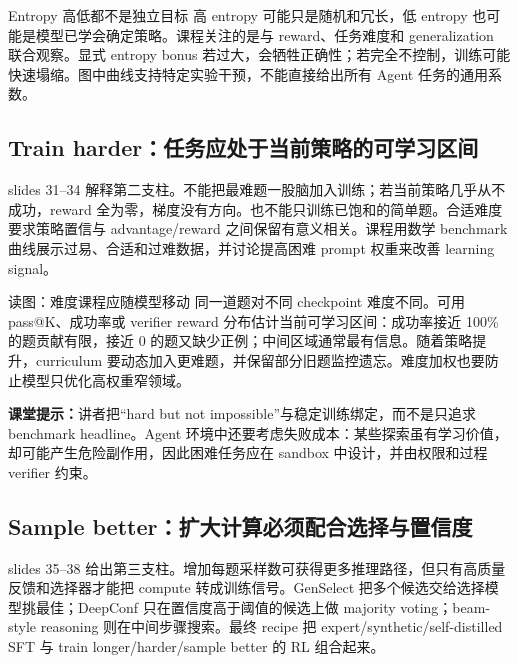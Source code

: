 \begin{warningbox}{Entropy 高低都不是独立目标}
高 entropy 可能只是随机和冗长，低 entropy 也可能是模型已学会确定策略。课程关注的是与 reward、任务难度和 generalization 联合观察。显式 entropy bonus 若过大，会牺牲正确性；若完全不控制，训练可能快速塌缩。图中曲线支持特定实验干预，不能直接给出所有 Agent 任务的通用系数。
\end{warningbox}

\subsection{Train harder：任务应处于当前策略的可学习区间}

slides 31--34 解释第二支柱。不能把最难题一股脑加入训练；若当前策略几乎从不成功，reward 全为零，梯度没有方向。也不能只训练已饱和的简单题。合适难度要求策略置信与 advantage/reward 之间保留有意义相关。课程用数学 benchmark 曲线展示过易、合适和过难数据，并讨论提高困难 prompt 权重来改善 learning signal。


\begin{knowledgebox}{读图：难度课程应随模型移动}
同一道题对不同 checkpoint 难度不同。可用 pass@K、成功率或 verifier reward 分布估计当前可学习区间：成功率接近 100\% 的题贡献有限，接近 0 的题又缺少正例；中间区域通常最有信息。随着策略提升，curriculum 要动态加入更难题，并保留部分旧题监控遗忘。难度加权也要防止模型只优化高权重窄领域。
\end{knowledgebox}

\textbf{课堂提示：}讲者把“hard but not impossible”与稳定训练绑定，而不是只追求 benchmark headline。Agent 环境中还要考虑失败成本：某些探索虽有学习价值，却可能产生危险副作用，因此困难任务应在 sandbox 中设计，并由权限和过程 verifier 约束。

\subsection{Sample better：扩大计算必须配合选择与置信度}

slides 35--38 给出第三支柱。增加每题采样数可获得更多推理路径，但只有高质量反馈和选择器才能把 compute 转成训练信号。GenSelect 把多个候选交给选择模型挑最佳；DeepConf 只在置信度高于阈值的候选上做 majority voting；beam-style reasoning 则在中间步骤搜索。最终 recipe 把 expert/synthetic/self-distilled SFT 与 train longer/harder/sample better 的 RL 组合起来。

